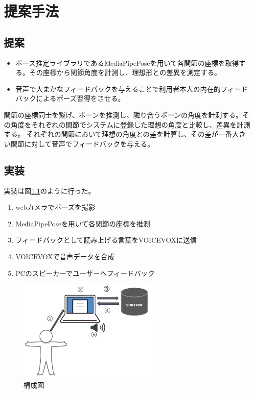 \chapter{提案手法}
\label{proposed}
\section{提案}
\begin{itemize}
  \item ポーズ推定ライブラリであるMediaPipePose\cite{mediapipe_pose_landmarker}を用いて各関節の座標を取得する。その座標から関節角度を計測し、理想形との差異を測定する。
  \item 音声で大まかなフィードバックを与えることで利用者本人の内在的フィードバックによるポーズ習得をさせる。
\end{itemize}
関節の座標同士を繋げ、ボーンを推測し、隣り合うボーンの角度を計測する。その角度をそれぞれの関節でシステムに登録した理想の角度と比較し、差異を計測する。
それぞれの関節において理想の角度との差を計算し、その差が一番大きい関節に対して音声でフィードバックを与える。

\section{実装}
実装は図\ref{fig:system_figure}のように行った。
\begin{enumerate}
  \item webカメラでポーズを撮影
  \item MediaPipePoseを用いて各関節の座標を推測
  \item フィードバックとして読み上げる言葉をVOICEVOXに送信
  \item VOICRVOXで音声データを合成
  \item PCのスピーカーでユーザーへフィードバック
  \end{enumerate}

  \begin{figure}[H]
    \begin{center}
      \includegraphics[width=7cm]{figures/system_figure.png}
      \caption{構成図}
      \label{fig:system_figure}
    \end{center}
  \end{figure}  

